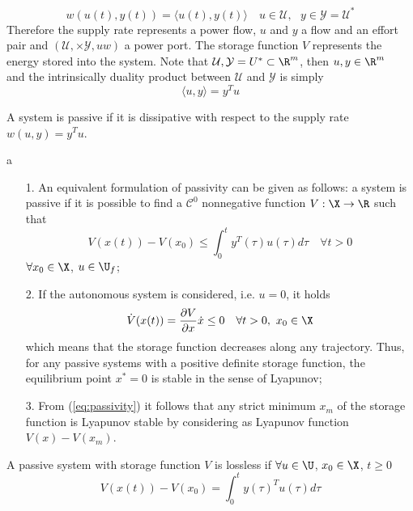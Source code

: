 %
\begin{equation*}
w(u(t),y(t))=\langle u(t),y(t)\rangle\quad u\in\mathcal{U}, \text{ }y\in\mathcal{Y}=\mathcal{U}^*
\end{equation*}
%
Therefore the supply rate represents a power flow, $u$ and $y$ a flow and an effort pair and $\left(\mathcal{U},\times\mathcal{Y},uw\right)$ a power port. The storage function $V$ represents the energy stored into the system.
%
Note that $\mathcal{U},\mathcal{Y}=U^*\subset\R^m$, then $u,y\in\R^m$　and  the intrinsically duality product between $\mathcal{U}$ and $\mathcal{Y}$ is simply
%
\begin{equation*}
\langle u,y\rangle=y^Tu
\end{equation*}
%
\begin{defn}
	A system is passive if it is dissipative with respect to the supply rate $w(u,y)=y^Tu$.
\end{defn}
%
\begin{rem}{\color{white}a}
	\begin{itemize}
		\item[1.] An equivalent formulation of passivity can be given as follows: a system is passive if it is possible to find a $\mathcal{C}^0$ nonnegative function $V:\X\rightarrow\R$ such that
		\begin{equation}\label{eq:passivity}
		V(x(t))-V(x_0)\leq\int_{0}^{t}y^T(\tau)u(\tau)d\tau \quad\forall t>0
		\end{equation}
		$\forall x_0\in\X$, $u\in \U_f$;
		\item[2.] If the autonomous system is considered, i.e. $u=0$, it holds
		\begin{equation*}
			\dot{V}(x(t))=\frac{\partial V}{\partial x}\dot{x}\leq 0\quad\forall t>0,\text{ }x_0\in\X
		\end{equation*}
		which means that the storage function decreases along any trajectory. Thus, for any passive systems with a positive definite storage function, the equilibrium point $x^*=0$ is stable in the sense of Lyapunov;
		\item[3.] From (\ref{eq:passivity}) it follows that any strict minimum $x_m$ of the storage function is Lyapunov stable by considering as Lyapunov function $V(x)-V(x_m)$.
	
\end{itemize}
\end{rem}
%
\begin{defn}
	A passive system with storage function $V$ is lossless if $\forall u\in\U$, $x_0\in\X$, $t\geq 0$
	\begin{equation*}
	V(x(t))-V(x_0)=\int_{0}^{t}y(\tau)^Tu(\tau)d\tau
	\end{equation*}
\end{defn}
